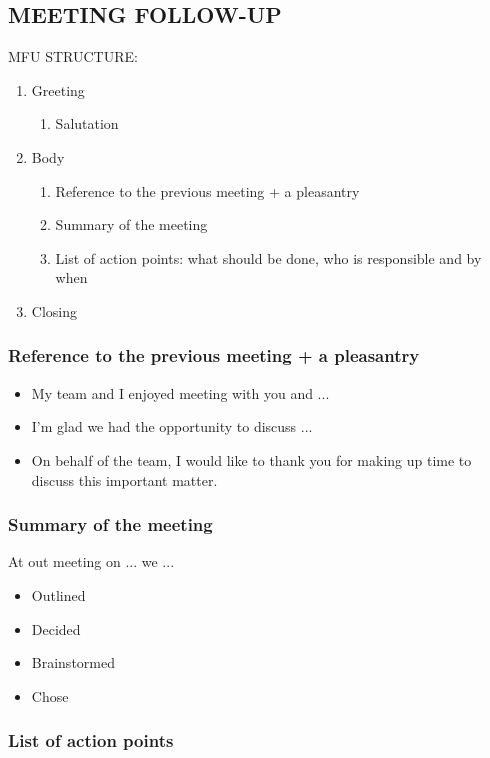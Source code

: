 \subsection{MEETING FOLLOW-UP}
MFU STRUCTURE:
\begin{enumerate}
\item Greeting
	\begin{enumerate}
	\item Salutation
	\end{enumerate}
\item Body
	\begin{enumerate}
	\item Reference to the previous meeting + a pleasantry
	\item Summary of the meeting
	\item List of action points: what should be done, who is responsible and by when
	\end{enumerate}
\item Closing
\end{enumerate}
\subsubsection{Reference to the previous meeting + a pleasantry}
\begin{itemize}
\item My team and I enjoyed meeting with you and ...
\item I'm glad we had the opportunity to discuss ...
\item On behalf of the team, I would like to thank you for making up time to discuss this important matter.
\end{itemize}
\subsubsection{Summary of the meeting}
At out meeting on ... we ...
\begin{itemize}
\item Outlined
\item Decided
\item Brainstormed
\item Chose
\end{itemize}
\subsubsection{List of action points}


